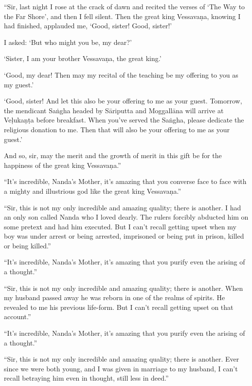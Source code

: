\documentclass[12pt,openany]{book}%
\begin{document}
“Sir, last night I rose at the crack of dawn and recited the verses of ‘The Way to the Far Shore’, and then I fell silent. Then the great king \textsanskrit{Vessavaṇa}, knowing I had finished, applauded me, ‘Good, sister! Good, sister!’ 

I asked: ‘But who might you be, my dear?’ 

‘Sister, I am your brother \textsanskrit{Vessavaṇa}, the great king.’ 

‘Good, my dear! Then may my recital of the teaching be my offering to you as my guest.’ 

‘Good, sister! And let this also be your offering to me as your guest. Tomorrow, the mendicant \textsanskrit{Saṅgha} headed by \textsanskrit{Sāriputta} and \textsanskrit{Moggallāna} will arrive at \textsanskrit{Veḷukaṇṭa} before breakfast. When you’ve served the \textsanskrit{Saṅgha}, please dedicate the religious donation to me. Then that will also be your offering to me as your guest.’ 

And so, sir, may the merit and the growth of merit in this gift be for the happiness of the great king \textsanskrit{Vessavaṇa}.” 

“It’s incredible, Nanda’s Mother, it’s amazing that you converse face to face with a mighty and illustrious god like the great king \textsanskrit{Vessavaṇa}.” 

“Sir, this is not my only incredible and amazing quality; there is another. I had an only son called Nanda who I loved dearly. The rulers forcibly abducted him on some pretext and had him executed. But I can’t recall getting upset when my boy was under arrest or being arrested, imprisoned or being put in prison, killed or being killed.” 

“It’s incredible, Nanda’s Mother, it’s amazing that you purify even the arising of a thought.” 

“Sir, this is not my only incredible and amazing quality; there is another. When my husband passed away he was reborn in one of the realms of spirits. He revealed to me his previous life-form. But I can’t recall getting upset on that account.” 

“It’s incredible, Nanda’s Mother, it’s amazing that you purify even the arising of a thought.” 

“Sir, this is not my only incredible and amazing quality; there is another. Ever since we were both young, and I was given in marriage to my husband, I can’t recall betraying him even in thought, still less in deed.” 
\end{document}
